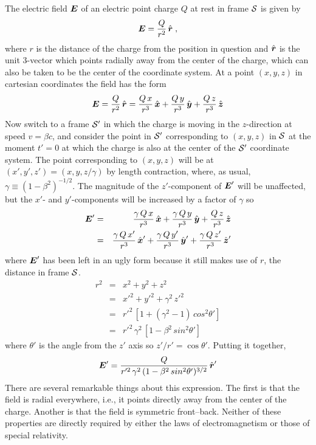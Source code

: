 The electric field $\mbox{\boldmath $E$}$ of an electric point charge $Q$ at rest in
frame $\cal S$ is given by
\begin{equation}
\mbox{\boldmath $E$}=\frac{Q}{r^2}\,\hat{\mbox{\boldmath $r$}} \; ,
\end{equation}
where $r$ is the distance of the charge from the position in question
and $\hat{\mbox{\boldmath $r$}}$ is the unit 3-vector which points radially away
from the center of the charge, which can also be taken to be the
center of the coordinate system.  At a point $(x,y,z)$ in cartesian
coordinates the field has the form
\begin{equation}
\mbox{\boldmath $E$}= \frac{Q}{r^2}\,\hat{\mbox{\boldmath $r$}}
      = \frac{Q\,x}{r^3}\,\hat{\mbox{\boldmath $x$}}
      + \frac{Q\,y}{r^3}\,\hat{\mbox{\boldmath $y$}}
      + \frac{Q\,z}{r^3}\,\hat{\mbox{\boldmath $z$}}
\end{equation}
Now switch to a frame $\cal S'$ in which the charge is moving in the
$z$-direction at speed $v=\beta c$, and consider the point in
$\cal S'$ corresponding to $(x,y,z)$ in $\cal S$ at the moment
$t'=0$ at which the charge is also at the center of the $\cal S'$
coordinate system.  The point corresponding to $(x,y,z)$ will be at
$(x',y',z')=(x,y,z/\gamma)$ by length contraction, where, as usual,
$\gamma\equiv (1-\beta^2)^{-1/2}$.  The magnitude of the
$z'$-component of $\mbox{\boldmath $E$}'$ will be unaffected, but the $x'$- and
$y'$-components will be increased by a factor of $\gamma$ so
\begin{eqnarray}
\mbox{\boldmath $E$}' & = & \frac{\gamma\,Q\,x}{r^3}\,\hat{\mbox{\boldmath $x$}}
            + \frac{\gamma\,Q\,y}{r^3}\,\hat{\mbox{\boldmath $y$}}
            + \frac{Q\,z}{r^3}\,\hat{\mbox{\boldmath $z$}} \nonumber\\
        & = & \frac{\gamma\,Q\,x'}{r^3}\,\hat{\mbox{\boldmath $x$}}'
            + \frac{\gamma\,Q\,y'}{r^3}\,\hat{\mbox{\boldmath $y$}}'
            + \frac{\gamma\,Q\,z'}{r^3}\,\hat{\mbox{\boldmath $z$}}'
\end{eqnarray}
where $\mbox{\boldmath $E$}'$ has been left in an ugly form because it still makes
use of $r$, the distance in frame $\cal S$.
\begin{eqnarray}
r^2 &=& x^2+y^2+z^2 \nonumber\\
    &=& x'^2+y'^2+\gamma^2\,z'^2 \nonumber\\
    &=& r'^2\,\left[1+(\gamma^2-1)\,cos^2\theta'\right] \nonumber\\
    &=& r'^2\,\gamma^2\,\left[1-\beta^2\,sin^2\theta'\right]
\end{eqnarray}
where $\theta'$ is the angle from the $z'$ axis so
$z'/r'=\cos\theta'$.  Putting it together,
\begin{equation}
\mbox{\boldmath $E$}'= \frac{Q}{r'^2\,\gamma^2\,(1-\beta^2\,sin^2\theta')^{3/2}}\,\hat{\mbox{\boldmath $r$}}'
\end{equation}
There are several remarkable things about this expression.  The first
is that the field is radial everywhere, i.e., it points directly away
from the center of the charge.  Another is that the field is symmetric
front--back.  Neither of these properties are directly required by
either the laws of electromagnetism or those of special relativity.

